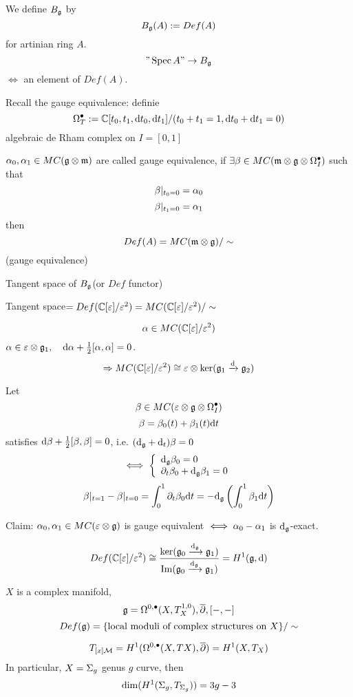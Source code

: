 \begin{definition}
We define $B_{\mathfrak{g}}$ by
$$B_{\mathfrak{g}}(A):=Def(A)$$
for artinian ring $A$.
$$"\operatorname{Spec} A"\to B_{\mathfrak{g}}$$
$\iff$ an element of $Def(A)$.
\end{definition}

Recall the gauge equivalence: definie
$$\Omega_T^{\bullet}:=\mathbb{C}[t_0,t_1,\mathrm{d} t_0,\mathrm{d} t_1]/(t_0+t_1=1,\mathrm{d} t_0+\mathrm{d} t_1=0)$$
algebraic de Rham complex on $I=[0,1]$

\begin{definition}
$\alpha_0,\alpha_1\in MC(\mathfrak{g}\otimes\mathfrak{m})$ are called gauge equivalence, if
$\exists\beta\in MC(\mathfrak{m}\otimes\mathfrak{g}\otimes\Omega_I^{\bullet})$ such that
$$\beta|_{t_0=0}=\alpha_0$$
$$\beta|_{t_1=0}=\alpha_1$$
then
$$Def(A)=MC(\mathfrak{m}\otimes\mathfrak{g})/\sim$$
(gauge equivalence)
\end{definition}

Tangent space of $B_{\mathfrak{g}}$(or $Def$ functor)

Tangent space$=Def(\mathbb{C}[\varepsilon]/\varepsilon^2)=MC(\mathbb{C}[\varepsilon]/\varepsilon^2)/\sim$

$$\alpha\in MC(\mathbb{C}[\varepsilon]/\varepsilon^2)$$
$\alpha\in\varepsilon\otimes\mathfrak{g}_1,\quad\mathrm{d}\alpha+\frac{1}{2}[\alpha,\alpha]=0$.
$$\Rightarrow MC(\mathbb{C}[\varepsilon]/\varepsilon^2)\cong\varepsilon\otimes\ker(\mathfrak{g}_1\xrightarrow{\mathrm{d}}\mathfrak{g}_2)$$

Let
$$\beta\in MC(\varepsilon\otimes\mathfrak{g}\otimes\Omega_I^{\bullet})$$
$$\beta=\beta_0(t)+\beta_1(t)\mathrm{d} t$$
satisfies $\mathrm{d}\beta+\frac{1}{2}[\beta,\beta]=0$, i.e. $(\mathrm{d}_{\mathfrak{g}}+\mathrm{d}_t)\beta=0$
$$
  \iff
  \left\{
    \begin{array}{l}
      \mathrm{d}_{\mathfrak{g}}\beta_0=0\\
      \partial_t\beta_0+\mathrm{d}_{\mathfrak{g}}\beta_1=0
    \end{array}
  \right.
$$
$$\beta|_{t=1}-\beta|_{t=0}=\int_{0}^{1}\partial_t\beta_0\mathrm{d} t
=-\mathrm{d}_{\mathfrak{g}}\left(\int_{0}^{1}\beta_1\mathrm{d} t\right)$$

Claim: $\alpha_0,\alpha_1\in MC(\varepsilon\otimes\mathfrak{g})$ is gauge equivalent
$\iff\alpha_0-\alpha_1$ is $\mathrm{d}_{\mathfrak{g}}$-exact.

\begin{cor}
$$Def(\mathbb{C}[\varepsilon]/\varepsilon^2)
\cong\frac{\ker(\mathfrak{g}_0\xrightarrow{\mathrm{d}_{\mathfrak{g}}}\mathfrak{g}_1)}
{\operatorname{Im}(\mathfrak{g}_0\xrightarrow{\mathrm{d}_{\mathfrak{g}}}\mathfrak{g}_1)}=H^1(\mathfrak{g},\mathrm{d})$$
\end{cor}

\begin{example}$X$ is a complex manifold,
$$\mathfrak{g}=\Omega^{0,\bullet}(X,T^{1,0}_X),\overline{\partial},[-,-]$$
$$Def(\mathfrak{g})=\{\text{local moduli of complex structures on $X$}\}/\sim$$

$$T_{[x]\mathcal{M}}=H^1(\Omega^{0,\bullet}(X,TX),\overline{\partial})=H^1(X,T_X)$$
In particular, $X=\Sigma_g$ genus $g$ curve, then
$$\dim(H^1(\Sigma_g,T_{\Sigma_g}))=3g-3$$
\end{example}

